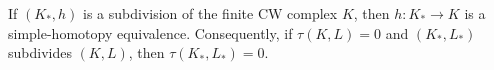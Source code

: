 If $(K_*, h)$ is a subdivision of the finite CW complex $K$, then $h: K_* \to K$ is a simple-homotopy equivalence. Consequently, if $\tau(K, L) = 0$ and $(K_*, L_*)$ subdivides $(K, L)$, then $\tau(K_*, L_*) = 0$.
